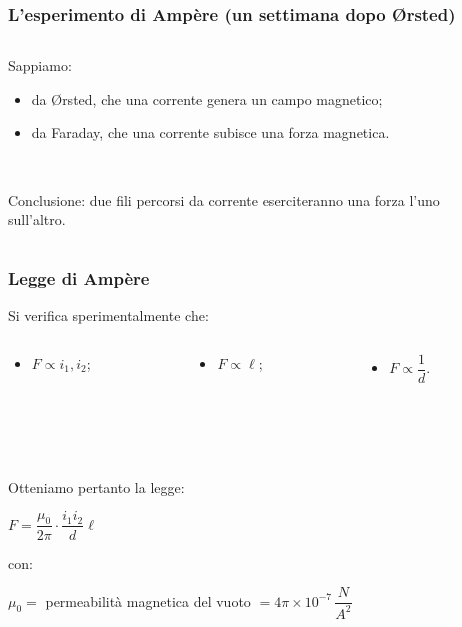 \documentclass[]{beamer}
\theoremstyle{plain}
\begin{document}
\begin{frame}
\frametitle{L'esperimento di Ampère (un settimana dopo \O rsted)}
\begin{columns}
\begin{column}{0.4\textwidth}
Sappiamo:
\begin{itemize}
  \item da \O rsted, che \alert<1>{una corrente genera un campo magnetico};\pause
  \item da Faraday, che \alert<2>{una corrente subisce una forza magnetica}.\pause
\end{itemize}

~

Conclusione: \alert<3>{due fili percorsi da corrente eserciteranno una forza l'uno sull'altro}.
\end{column}
\begin{column}{0.5\textwidth}
\end{column}
\end{columns}
\end{frame}

\begin{frame}
\frametitle{Legge di Ampère}
Si verifica sperimentalmente che:
\begin{columns}
\begin{column}{0.3\textwidth}
\begin{itemize}
  \item $ F \propto i_1, i_2 $;
\end{itemize}
\end{column}
\begin{column}{0.3\textwidth}
\begin{itemize}
  \item $ F \propto \ell $;
\end{itemize}
\end{column}
\begin{column}{0.3\textwidth}
\begin{itemize}
  \item $ F \propto \dfrac{1}{d} $.
\end{itemize}
\end{column}
\end{columns}\pause

~

~

Otteniamo pertanto la legge:
\begin{center}
\colorbox{marroncino!30}{$ F = \dfrac{\mu_0}{2\pi} \cdot \dfrac{i_1i_2}{d}\ell $}
\end{center}
con:
\begin{center}
\colorbox{marroncino!30}{$ \mu_0 = $ permeabilità magnetica del vuoto $ = 4\pi \times 10^{-7} \, \dfrac{N}{A^2} $}
\end{center}
\end{frame}
\end{document}
